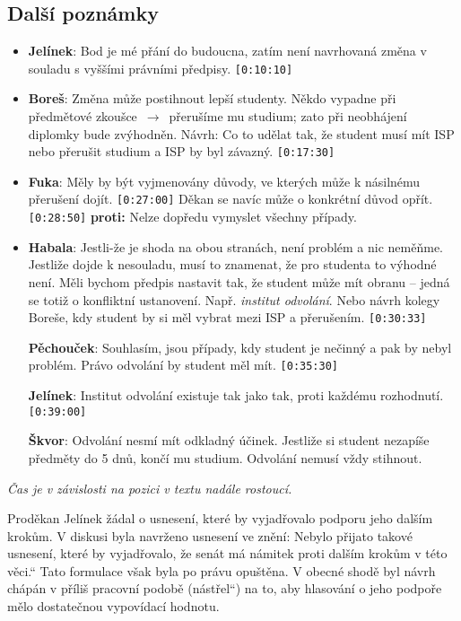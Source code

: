 \documentclass[a4paper,10pt,notitlepage]{article}
\newcommand{\ts}[1]{\texttt{[#1]}}
\newcommand{\cl}[1]{\noindent \textbf{#1}:}
\newcommand{\pozn}[1]{\begin{center}\textit{#1}\end{center}}
\newcommand\uv[1]{\quotedblbase #1\textquotedblleft}%
\begin{document}
\subsection{Další poznámky}
\begin{itemize}
\item \cl{Jelínek} Bod je mé přání do budoucna, zatím není navrhovaná změna v souladu s vyššími právními předpisy. \ts{0:10:10}

\item \cl{Boreš} Změna může postihnout lepší studenty. Někdo vypadne při předmětové zkoušce~$\rightarrow$~přerušíme mu studium; zato  při neobhájení diplomky bude zvýhodněn. Návrh: Co to udělat tak, že student musí mít ISP nebo přerušit studium a ISP by byl závazný. \ts{0:17:30}

\item \cl{Fuka} Měly by být vyjmenovány důvody, ve kterých může k násilnému přerušení dojít. \ts{0:27:00} Děkan se navíc může o konkrétní důvod opřít. \ts{0:28:50} \textbf{proti:} Nelze dopředu vymyslet všechny případy.

\item \cl{Habala} Jestli-že je shoda na obou stranách, není problém a nic neměňme. Jestliže dojde k nesouladu, musí to znamenat, že pro studenta to výhodné není. Měli bychom předpis nastavit tak, že student může mít obranu -- jedná se totiž o konfliktní ustanovení. Např. \textit{institut odvolání}. Nebo návrh kolegy Boreše, kdy student by si měl vybrat mezi ISP a přerušením. \ts{0:30:33}

\cl{Pěchouček} Souhlasím, jsou případy, kdy student je nečinný a pak by nebyl problém. Právo odvolání by student měl mít. \ts{0:35:30}

\cl{Jelínek} Institut odvolání existuje tak jako tak, proti každému rozhodnutí. \ts{0:39:00}

\cl{Škvor} Odvolání nesmí mít odkladný účinek. Jestliže si student nezapíše předměty do 5 dnů, končí mu studium. Odvolání nemusí vždy stihnout.
\end{itemize}

\pozn{Čas je v závislosti na pozici v textu nadále rostoucí.}

\noindent Proděkan Jelínek žádal o usnesení, které by vyjadřovalo podporu jeho dalším krokům. V diskusi byla navrženo usnesení ve znění: \uv{Nebylo přijato takové usnesení, které by vyjadřovalo, že senát má námitek proti dalším krokům v této věci.} Tato formulace však byla po právu opuštěna. V obecné shodě byl návrh chápán v příliš pracovní podobě (\uv{nástřel}) na to, aby hlasování o jeho podpoře mělo dostatečnou vypovídací hodnotu.
\end{document}
